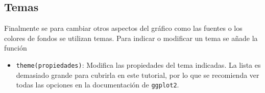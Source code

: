 \documentclass[
  a4paper,
]{scrreport}
\providecommand{\tightlist}{%
  \setlength{\itemsep}{0pt}\setlength{\parskip}{0pt}}\usepackage{longtable,booktabs,array}
\theoremstyle{definition}
\theoremstyle{definition}
\theoremstyle{remark}
\begin{document}
\subsection{Temas}\label{temas}

Finalmente se para cambiar otros aspectos del gráfico como las fuentes o
los colores de fondos se utilizan temas. Para indicar o modificar un
tema se añade la función

\begin{itemize}
\tightlist
\item
  \texttt{theme(propiedades)}: Modifica las propiedades del tema
  indicadas. La lista es demasiado grande para cubrirla en este
  tutorial, por lo que se recomienda ver todas las opciones en la
  documentación de \texttt{ggplot2}.
\end{itemize}
\end{document}
